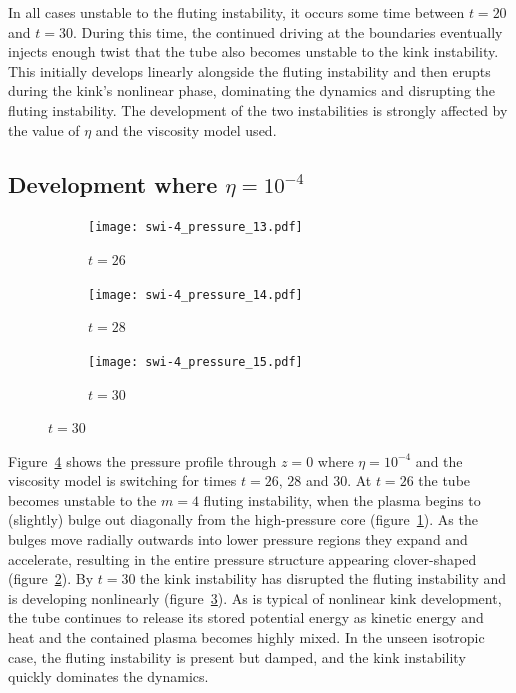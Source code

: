 In all cases unstable to the fluting instability, it occurs some time between $t=20$ and $t=30$. During this time, the continued driving at the boundaries eventually injects enough twist that the tube also becomes unstable to the kink instability. This initially develops linearly alongside the fluting instability and then erupts during the kink's nonlinear phase, dominating the dynamics and disrupting the fluting instability. The development of the two instabilities is strongly affected by the value of $\eta$ and the viscosity model used.

\subsection{Development where $\eta=10^{-4}$}

\begin{figure}[t]
  \centering
    \begin{subfigure}{0.32\textwidth}
      \texttt{[image: swi-4\_pressure\_13.pdf]}
      \caption{$t=26$}
      \label{fig:swi-4_pressure_13}
    \end{subfigure}
    \hfill
    \begin{subfigure}{0.32\textwidth}
      \texttt{[image: swi-4\_pressure\_14.pdf]}
      \caption{$t=28$}
      \label{fig:swi-4_pressure_14}
    \end{subfigure}
    \hfill
    \begin{subfigure}{0.32\textwidth}
      \texttt{[image: swi-4\_pressure\_15.pdf]}
      \caption{$t=30$}
      \label{fig:swi-4_pressure_15}
    \end{subfigure}
\label{fig:kink_pressure_slices-4}%
\end{figure}

Figure~\ref{fig:kink_pressure_slices-4} shows the pressure profile through $z=0$ where $\eta=10^{-4}$ and the viscosity model is switching for times $t=26$, $28$ and $30$. At $t=26$ the tube becomes unstable to the $m=4$ fluting instability, when the plasma begins to (slightly) bulge out diagonally from the high-pressure core (figure~\ref{fig:swi-4_pressure_13}). As the bulges move radially outwards into lower pressure regions they expand and accelerate, resulting in the entire pressure structure appearing clover-shaped (figure~\ref{fig:swi-4_pressure_14}). By $t=30$ the kink instability has disrupted the fluting instability and is developing nonlinearly (figure~\ref{fig:swi-4_pressure_15}). As is typical of nonlinear kink development, the tube continues to release its stored potential energy as kinetic energy and heat and the contained plasma becomes highly mixed. In the unseen isotropic case, the fluting instability is present but damped, and the kink instability quickly dominates the dynamics.

